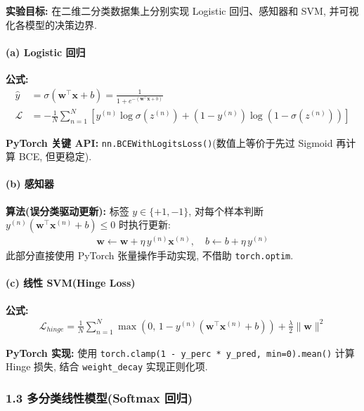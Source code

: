\documentclass{../../nndlcourse}
\begin{document}
\textbf{实验目标: }在二维二分类数据集上分别实现 Logistic 回归、感知器和 SVM, 并可视化各模型的决策边界.

\paragraph{(a) Logistic 回归}

\textbf{公式: }
\begin{align}
    \hat{y} &= \sigma(\boldsymbol{w}^\top\boldsymbol{x} + b) = \frac{1}{1+e^{-(\boldsymbol{w}^\top\boldsymbol{x}+b)}} \\
    \mathcal{L} &= -\frac{1}{N}\sum_{n=1}^N \left[y^{(n)}\log\sigma(z^{(n)}) + (1-y^{(n)})\log(1-\sigma(z^{(n)}))\right]
\end{align}

\textbf{PyTorch 关键 API: }\texttt{nn.BCEWithLogitsLoss()}(数值上等价于先过 Sigmoid 再计算 BCE, 但更稳定).

\paragraph{(b) 感知器}

\textbf{算法(误分类驱动更新): }标签 $y \in \{+1, -1\}$, 对每个样本判断 $y^{(n)}(\boldsymbol{w}^\top\boldsymbol{x}^{(n)} + b) \le 0$ 时执行更新: 
\begin{align}
    \boldsymbol{w} \leftarrow \boldsymbol{w} + \eta\, y^{(n)}\boldsymbol{x}^{(n)}, \quad b \leftarrow b + \eta\, y^{(n)}
\end{align}
此部分直接使用 PyTorch 张量操作手动实现, 不借助 \texttt{torch.optim}.

\paragraph{(c) 线性 SVM(Hinge Loss)}

\textbf{公式: }
\begin{align}
    \mathcal{L}_{hinge} = \frac{1}{N}\sum_{n=1}^N\max\left(0,\, 1 - y^{(n)}(\boldsymbol{w}^\top\boldsymbol{x}^{(n)} + b)\right) + \frac{\lambda}{2}\|\boldsymbol{w}\|^2
\end{align}

\textbf{PyTorch 实现: }使用 \texttt{torch.clamp(1 - y\_perc * y\_pred, min=0).mean()} 计算 Hinge 损失, 结合 \texttt{weight\_decay} 实现正则化项.

\subsubsection*{1.3 多分类线性模型(Softmax 回归)}
\end{document}
